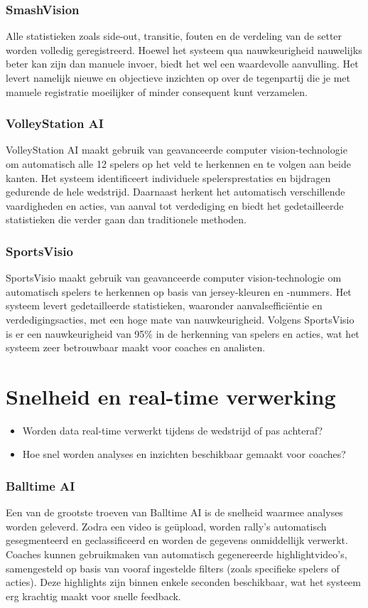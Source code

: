 \subsubsection{SmashVision}
Alle statistieken zoals side-out, transitie, fouten en de verdeling van de setter worden volledig geregistreerd. Hoewel het systeem qua nauwkeurigheid nauwelijks beter kan zijn dan manuele invoer, biedt het wel een waardevolle aanvulling. Het levert namelijk nieuwe en objectieve inzichten op over de tegenpartij die je met manuele registratie moeilijker of minder consequent kunt verzamelen.
\subsubsection{VolleyStation AI}
VolleyStation AI maakt gebruik van geavanceerde computer vision-technologie om automatisch alle 12 spelers op het veld te herkennen en te volgen aan beide kanten. Het systeem identificeert individuele spelersprestaties en bijdragen gedurende de hele wedstrijd. Daarnaast herkent het automatisch verschillende vaardigheden en acties, van aanval tot verdediging en biedt het gedetailleerde statistieken die verder gaan dan traditionele methoden.
\subsubsection{SportsVisio}
SportsVisio maakt gebruik van geavanceerde computer vision-technologie om automatisch spelers te herkennen op basis van jersey-kleuren en -nummers. Het systeem levert gedetailleerde statistieken, waaronder aanvalsefficiëntie en verdedigingsacties, met een hoge mate van nauwkeurigheid. Volgens SportsVisio is er een nauwkeurigheid van 95\% in de herkenning van spelers en acties, wat het systeem zeer betrouwbaar maakt voor coaches en analisten.

\section{Snelheid en real-time verwerking}
\begin{itemize}
  \item Worden data real-time verwerkt tijdens de wedstrijd of pas achteraf?
  \item Hoe snel worden analyses en inzichten beschikbaar gemaakt voor coaches?
\end{itemize}
\subsubsection{Balltime AI}
Een van de grootste troeven van Balltime AI is de snelheid waarmee analyses worden geleverd. Zodra een video is geüpload, worden rally’s automatisch gesegmenteerd en geclassificeerd en worden de gegevens onmiddellijk verwerkt. Coaches kunnen gebruikmaken van automatisch gegenereerde highlightvideo’s, samengesteld op basis van vooraf ingestelde filters (zoals specifieke spelers of acties). Deze highlights zijn binnen enkele seconden beschikbaar, wat het systeem erg krachtig maakt voor snelle feedback.
